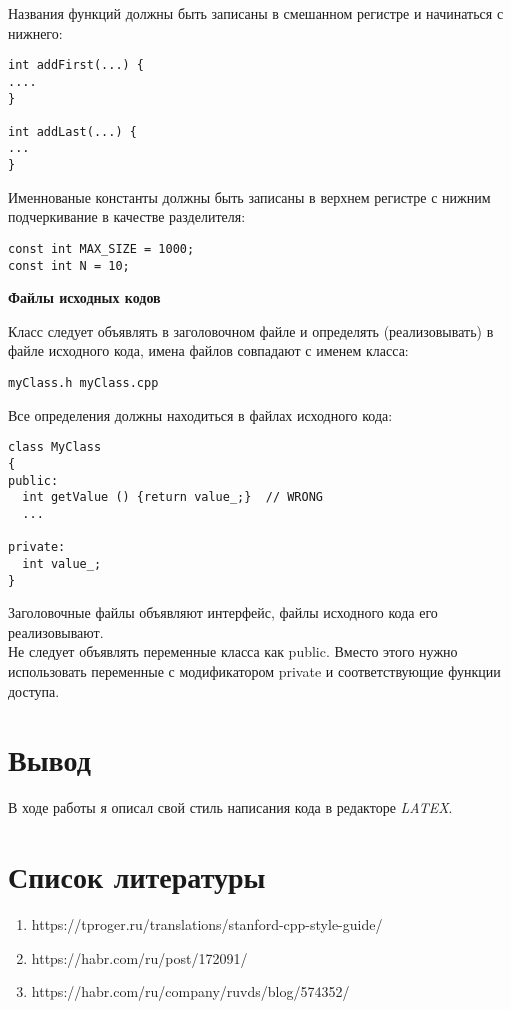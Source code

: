 \documentclass[12pt]{article}
\begin{document}
Названия функций должны быть записаны в смешанном регистре и начинаться с нижнего:
\begin{lstlisting}
int addFirst(...) {
....
}

int addLast(...) {
...
}
\end{lstlisting}

Именнованые константы должны быть записаны в верхнем регистре с нижним подчеркивание в качестве разделителя:
\begin{lstlisting}
const int MAX_SIZE = 1000;
const int N = 10;
\end{lstlisting}
\textbf{Файлы исходных кодов}

 Класс следует объявлять в заголовочном файле и определять (реализовывать) в файле исходного кода, имена файлов совпадают с именем класса:
\begin{lstlisting}
myClass.h myClass.cpp
\end{lstlisting}

Все определения должны находиться в файлах исходного кода:
\begin{lstlisting}
class MyClass
{
public:
  int getValue () {return value_;}  // WRONG
  ...

private:
  int value_;
}
\end{lstlisting}
Заголовочные файлы объявляют интерфейс, файлы исходного кода его реализовывают.
\\Не следует объявлять переменные класса как public. Вместо этого нужно использовать переменные с модификатором private и соответствующие
функции доступа.

\section{Вывод}
В ходе работы я описал свой стиль написания кода в редакторе \textit{LATEX}.

\section{Список литературы}

\begin{enumerate}
    \item https://tproger.ru/translations/stanford-cpp-style-guide/
    \item https://habr.com/ru/post/172091/
    \item https://habr.com/ru/company/ruvds/blog/574352/
\end{enumerate}
\end{document}
